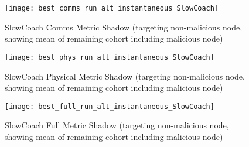 \documentclass[aspectratio=43]{beamer}
\begin{document}
\begin{frame}\begin{figure}[h]
	\centering
	\texttt{[image: best\_comms\_run\_alt\_instantaneous\_SlowCoach]}
	\caption{SlowCoach Comms Metric Shadow (targeting non-malicious node, showing mean of remaining cohort including malicious node)}
	\label{fig:comms_alt_instantaneous_slowcoach}
\end{figure}\end{frame}

\begin{frame}\begin{figure}[h]
	\centering
	\texttt{[image: best\_phys\_run\_alt\_instantaneous\_SlowCoach]}
	\caption{SlowCoach Physical Metric Shadow (targeting non-malicious node, showing mean of remaining cohort including malicious node)}
	\label{fig:phys_alt_instantaneous_slowcoach}
\end{figure}\end{frame}

\begin{frame}\begin{figure}[h]
	\centering
	\texttt{[image: best\_full\_run\_alt\_instantaneous\_SlowCoach]}
	\caption{SlowCoach Full Metric Shadow (targeting non-malicious node, showing mean of remaining cohort including malicious node)}
	\label{fig:full_alt_instantaneous_slowcoach}
\end{figure}\end{frame}
\end{document}

